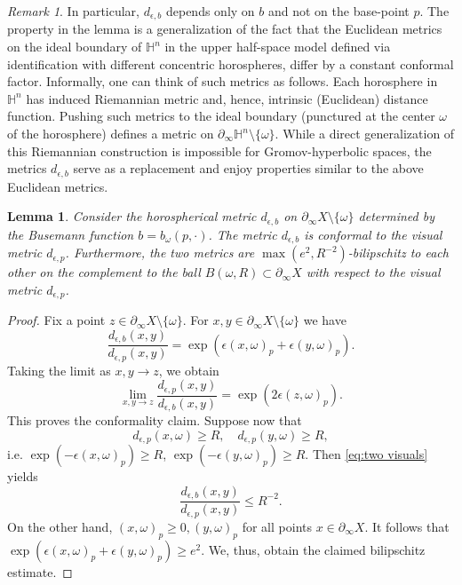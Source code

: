 \documentclass[12pt]{amsbook}%
\newtheorem{lem}[thm]{Lemma}
\theoremstyle{definition}
\theoremstyle{remark}
\newtheorem{rem}[thm]{Remark}
\numberwithin{section}{chapter}
\numberwithin{subsection}{section}
\numberwithin{figure}{chapter}
\def\eps{\epsilon}
\def\bH{{\mathbb{H}}}
\def\geo{\partial_\infty}
\begin{document}
\begin{rem}
In particular, $d_{\eps,b}$ depends only on $b$ and not on the base-point $p$. The property in the lemma is a generalization of the fact that the Euclidean 
metrics on the ideal boundary of $\bH^n$ in the upper half-space model defined via identification with different concentric horospheres, differ by a constant conformal factor. 
Informally, one can think of such metrics as follows. Each horosphere in $\bH^n$ has induced Riemannian metric and, hence, intrinsic (Euclidean) distance function. Pushing 
such metrics to the ideal boundary (punctured at the center $\omega$ of the horosphere) defines a metric on $\geo \bH^n \setminus \{\omega\}$. While a direct generalization 
of this Riemannian construction is impossible for Gromov-hyperbolic spaces, the metrics $d_{\eps,b}$ serve as a replacement and enjoy properties similar to the above 
Euclidean metrics. 
\end{rem}

\begin{lem}\label{lem:horospherical-bilip1}
Consider the horospherical metric $d_{\eps,b}$ on $\geo X\setminus \{\omega\}$ determined by 
the Busemann function $b=b_\omega(p,\cdot)$. The metric $d_{\eps,b}$ is conformal to the visual metric 
$d_{\eps,p}$. Furthermore, the two metrics are $\max(e^2, R^{-2})$-bilipschitz to each other on the complement to the ball $B(\omega,R)\subset \geo X$ with respect to the visual metric  $d_{\eps,p}$. 
\end{lem}
\begin{proof} Fix a point $z\in \geo X\setminus \{\omega\}$. For $x, y\in \geo X\setminus \{\omega\}$ we have 
\begin{equation}\label{eq:two visuals}
\frac{d_{\eps,b}(x,y)}{d_{\eps,p}(x,y)}= \exp(\eps (x,\omega)_p+ \eps (y,\omega)_p).
\end{equation}
Taking the limit as $x, y\to z$, we obtain
$$
\lim_{x,y\to z} \frac{d_{\eps,p}(x,y)}{d_{\eps,b}(x,y)}= \exp(2\eps(z,\omega)_p). 
$$
This proves the conformality claim. Suppose now that 
$$
d_{\eps,p}(x,\omega)\geqslant R, \quad d_{\eps,p}(y,\omega)\geqslant R, 
$$
i.e. $\exp(-\eps (x,\omega)_p)\geqslant R$, $\exp(-\eps (y,\omega)_p)\geqslant R$.  Then \eqref{eq:two visuals} yields
$$
\frac{d_{\eps,b}(x,y)}{d_{\eps,p}(x,y)}\leqslant R^{-2}. 
$$
On the other hand, $(x,\omega)_p\geqslant 0, (y,\omega)_p$ for all points $x\in \geo X$. It follows that 
$\exp(\eps (x,\omega)_p+ \eps (y,\omega)_p)\geqslant e^2$. We, thus, obtain the claimed bilipschitz estimate. 
\end{proof}
\end{document}
